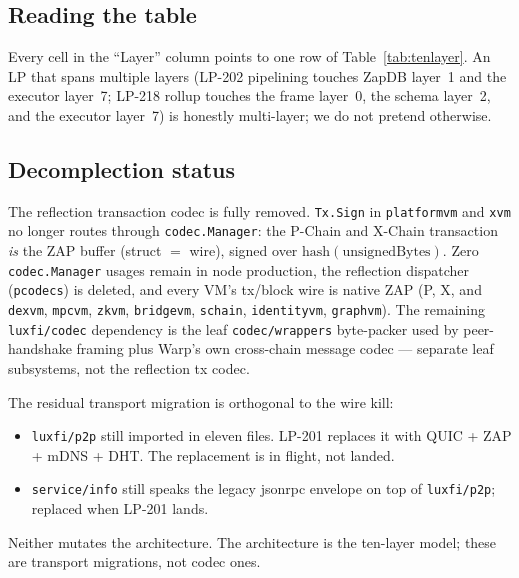 \subsection{Reading the table}

Every cell in the ``Layer'' column points to one row of
Table~\ref{tab:tenlayer}. An LP that spans multiple layers (LP-202
pipelining touches ZapDB layer~1 and the executor layer~7; LP-218
rollup touches the frame layer~0, the schema layer~2, and the
executor layer~7) is honestly multi-layer; we do not pretend
otherwise.

\subsection{Decomplection status}

The reflection transaction codec is fully removed. \texttt{Tx.Sign} in
\texttt{platformvm} and \texttt{xvm} no longer routes through
\texttt{codec.Manager}: the P-Chain and X-Chain transaction \emph{is}
the ZAP buffer (struct $=$ wire), signed over $\mathrm{hash}(\text{unsignedBytes})$.
Zero \texttt{codec.Manager} usages remain in node production, the
reflection dispatcher (\texttt{pcodecs}) is deleted, and every VM's
tx/block wire is native ZAP (P, X, and \texttt{dexvm}, \texttt{mpcvm},
\texttt{zkvm}, \texttt{bridgevm}, \texttt{schain}, \texttt{identityvm},
\texttt{graphvm}). The remaining \texttt{luxfi/codec} dependency is the
leaf \texttt{codec/wrappers} byte-packer used by peer-handshake framing
plus Warp's own cross-chain message codec --- separate leaf subsystems,
not the reflection tx codec.

The residual transport migration is orthogonal to the wire kill:

\begin{itemize}[leftmargin=2em,nosep]
\item \texttt{luxfi/p2p} still imported in eleven files. LP-201
  replaces it with QUIC + ZAP + mDNS + DHT. The replacement is in
  flight, not landed.
\item \texttt{service/info} still speaks the legacy jsonrpc envelope on
  top of \texttt{luxfi/p2p}; replaced when LP-201 lands.
\end{itemize}

Neither mutates the architecture. The architecture is the ten-layer
model; these are transport migrations, not codec ones.
